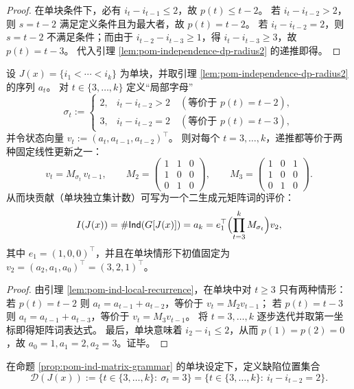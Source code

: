 \begin{proof}
在单块条件下，必有 $i_t-i_{t-1}\le 2$，故 $p(t)\le t-2$。
若 $i_t-i_{t-2}>2$，则 $s=t-2$ 满足定义条件且为最大者，故 $p(t)=t-2$。
若 $i_t-i_{t-2}=2$，则 $s=t-2$ 不满足条件；而由于 $i_{t-2}-i_{t-3}\ge 1$，得 $i_t-i_{t-3}\ge 3$，故 $p(t)=t-3$。
代入引理 \ref{lem:pom-independence-dp-radius2} 的递推即得。
\end{proof}

\begin{proposition}[单块的二字母矩阵语法]\label{prop:pom-ind-matrix-grammar}
设 $J(x)=\{i_1<\cdots<i_k\}$ 为单块，并取引理 \ref{lem:pom-independence-dp-radius2} 的序列 $a_t$。
对 $t\in\{3,\dots,k\}$ 定义“局部字母”
\[
\sigma_t:=
\begin{cases}
2,& i_t-i_{t-2}>2\quad(\text{等价于 }p(t)=t-2),\\
3,& i_t-i_{t-2}=2\quad(\text{等价于 }p(t)=t-3),
\end{cases}
\]
并令状态向量
\(
v_t:=(a_t,a_{t-1},a_{t-2})^\top
\)。
则对每个 $t=3,\dots,k$，递推都等价于两种固定线性更新之一：
\[
v_t=M_{\sigma_t}\,v_{t-1},
\qquad
M_2=
\begin{pmatrix}
1&1&0\\
1&0&0\\
0&1&0
\end{pmatrix},
\qquad
M_3=
\begin{pmatrix}
1&0&1\\
1&0&0\\
0&1&0
\end{pmatrix}.
\]
从而块贡献（单块独立集计数）可写为一个二生成元矩阵词的评价：
\[
I(J(x))=\#\mathsf{Ind}(G[J(x)])=a_k
=e_1^\top\Bigl(\prod_{t=3}^k M_{\sigma_t}\Bigr)v_2,
\]
其中 $e_1=(1,0,0)^\top$，并且在单块情形下初值固定为
\(
v_2=(a_2,a_1,a_0)^\top=(3,2,1)^\top
\)。
\end{proposition}
\begin{proof}
由引理 \ref{lem:pom-ind-local-recurrence}，在单块中对 $t\ge 3$ 只有两种情形：
若 $p(t)=t-2$ 则 $a_t=a_{t-1}+a_{t-2}$，等价于 $v_t=M_2v_{t-1}$；
若 $p(t)=t-3$ 则 $a_t=a_{t-1}+a_{t-3}$，等价于 $v_t=M_3v_{t-1}$。
将 $t=3,\dots,k$ 逐步迭代并取第一坐标即得矩阵词表达式。
最后，单块意味着 $i_2-i_1\le 2$，从而 $p(1)=p(2)=0$，故 $a_0=1,a_1=2,a_2=3$。证毕。
\end{proof}

\begin{definition}[缺陷集]\label{def:pom-ind-defect-set}
在命题 \ref{prop:pom-ind-matrix-grammar} 的单块设定下，定义缺陷位置集合
\[
\mathcal D(J(x)):=\{t\in\{3,\dots,k\}:\ \sigma_t=3\}
=\{t\in\{3,\dots,k\}:\ i_t-i_{t-2}=2\}.
\]
\end{definition}


